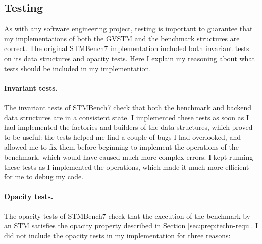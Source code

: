 \documentclass[12pt,a4paper,oneside,openright]{report}
\begin{document}
\subsection{Testing}
\label{sec:impl:testing}

As with any software engineering project, testing is important to
guarantee that my implementations of both the GVSTM and the benchmark
structures are correct. The original STMBench7 implementation included
both invariant tests on its data structures and opacity tests. Here I
explain my reasoning about what tests should be included in my
implementation.

\paragraph{Invariant tests.} The invariant tests of STMBench7 check
that both the benchmark and backend data structures are in a
consistent state. I implemented these tests as soon as I had
implemented the factories and builders of the data structures, which
proved to be useful: the tests helped me find a couple of bugs I had
overlooked, and allowed me to fix them before beginning to implement
the operations of the benchmark, which would have caused much more
complex errors. I kept running these tests as I implemented the
operations, which made it much more efficient for me to debug my code.

\paragraph{Opacity tests.} The opacity tests of STMBench7 check that
the execution of the benchmark by an STM satisfies the opacity
property described in Section \ref{sec:prep:techn-requ}. I did not
include the opacity tests in my implementation for three reasons:
\end{document}
